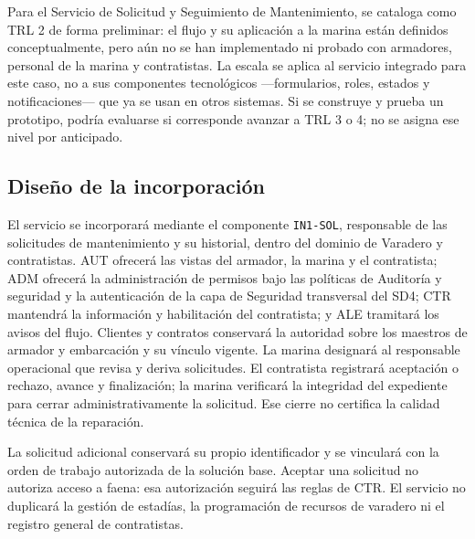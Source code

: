Para el Servicio de Solicitud y Seguimiento de Mantenimiento, se cataloga como TRL 2 de forma preliminar: el flujo y su aplicación a la marina están definidos conceptualmente, pero aún no se han implementado ni probado con armadores, personal de la marina y contratistas. La escala se aplica al servicio integrado para este caso, no a sus componentes tecnológicos —formularios, roles, estados y notificaciones— que ya se usan en otros sistemas. Si se construye y prueba un prototipo, podría evaluarse si corresponde avanzar a TRL 3 o 4; no se asigna ese nivel por anticipado.

\subsection{Diseño de la incorporación}

El servicio se incorporará mediante el componente \texttt{IN1-SOL}, responsable de las solicitudes de mantenimiento y su historial, dentro del dominio de Varadero y contratistas. AUT ofrecerá las vistas del armador, la marina y el contratista; ADM ofrecerá la administración de permisos bajo las políticas de Auditoría y seguridad y la autenticación de la capa de Seguridad transversal del SD4; CTR mantendrá la información y habilitación del contratista; y ALE tramitará los avisos del flujo. Clientes y contratos conservará la autoridad sobre los maestros de armador y embarcación y su vínculo vigente. La marina designará al responsable operacional que revisa y deriva solicitudes. El contratista registrará aceptación o rechazo, avance y finalización; la marina verificará la integridad del expediente para cerrar administrativamente la solicitud. Ese cierre no certifica la calidad técnica de la reparación.

La solicitud adicional conservará su propio identificador y se vinculará con la orden de trabajo autorizada de la solución base. Aceptar una solicitud no autoriza acceso a faena: esa autorización seguirá las reglas de CTR. El servicio no duplicará la gestión de estadías, la programación de recursos de varadero ni el registro general de contratistas.

